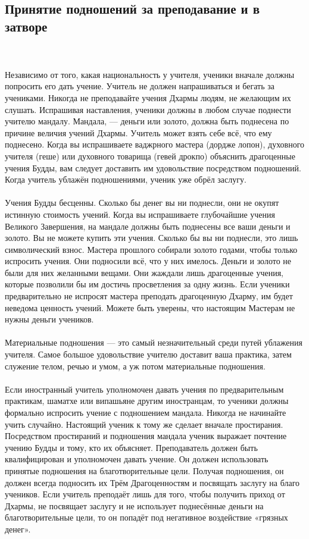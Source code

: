 \subsection{Принятие подношений за преподавание и в затворе}
\\ \\ Независимо от того, какая национальность у учителя, ученики вначале должны попросить его дать учение. Учитель не должен напрашиваться и бегать за учениками. Никогда не преподавайте учения Дхармы людям, не желающим их слушать. Испрашивая наставления, ученики должны в любом случае поднести учителю мандалу. Мандала, — деньги или золото, должна быть поднесена по причине величия учений Дхармы. Учитель может взять себе всё, что ему поднесено. Когда вы испрашиваете ваджрного мастера (дордже лопон), духовного учителя (геше) или духовного товарища (гевей дрокпо) объяснить драгоценные учения Будды, вам следует доставить им удовольствие посредством подношений. Когда учитель ублажён подношениями, ученик уже обрёл заслугу.
\\ \\ Учения Будды бесценны. Сколько бы денег вы ни поднесли, они не окупят истинную стоимость учений. Когда вы испрашиваете глубочайшие учения Великого Завершения, на мандале дол\-жны быть поднесены все ваши деньги и золото. Вы не можете купить эти учения. Сколько бы вы ни поднесли, это лишь символический взнос. Мастера прошлого собирали золото годами, чтобы только испросить учения. Они подносили всё, что у них имелось. Деньги и золото не были для них желанными вещами. Они жаждали лишь драгоценные учения, которые позволили бы им достичь просветления за одну жизнь. Если ученики предварительно не испросят мастера преподать драгоценную Дхарму, им будет неведома ценность учений. Можете быть уверены, что настоящим Мастерам не нужны деньги учеников.
\\ \\ Материальные подношения — это самый незначительный среди путей ублажения учителя. Самое большое удовольствие учите\-лю доставит ваша практика, затем служение телом, речью и умом, а уж потом материальные подношения.
\\ \\ Если иностранный учитель уполномочен давать учения по предварительным практикам, шаматхе или випашьяне другим иностранцам, то ученики должны формально испросить учение с подношением мандала. Никогда не начинайте учить случай\-но. Настоящий ученик к тому же сделает вначале простирания. Посредством простираний и подношения мандала ученик вы\-ражает почтение учению Будды и тому, кто их объясняет. Преподаватель должен быть квалифицирован и уполномочен давать учение. Он должен использовать принятые подношения на благотвори\-тельные цели. Получая подношения, он должен всегда подносить их Трём Драгоценностям и посвя\-щать заслу\-гу на благо учеников. Если учитель преподаёт лишь для того, чтобы получить приход от Дхармы, не посвящает заслугу и не использует поднесённые деньги на благотвори\-тельные цели, то он попадёт под негативное воздействие «грязных денег».
